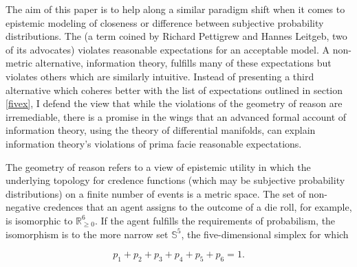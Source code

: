 \documentclass[11pt]{article}
\begin{document}
The aim of this paper is to help along a similar paradigm shift when
it comes to epistemic modeling of closeness or difference between
subjective probability distributions. The 
(a term coined by Richard Pettigrew and Hannes Leitgeb, two of its
advocates) violates reasonable expectations for an acceptable model. A
non-metric alternative, information theory, fulfills many of these
expectations but violates others which are similarly intuitive.
Instead of presenting a third alternative which coheres better with
the list of expectations outlined in section \ref{fivex}, I defend the
view that while the violations of the geometry of reason are
irremediable, there is a promise in the wings that an advanced formal
account of information theory, using the theory of differential
manifolds, can explain information theory's violations of prima facie
reasonable expectations.

The geometry of reason refers to a view of epistemic utility in which
the underlying topology for credence functions (which may be
subjective probability distributions) on a finite number of events is
a metric space. The set of non-negative credences that an agent
assigns to the outcome of a die roll, for example, is isomorphic to
$\mathbb{R}_{\geq{}0}^{6}$. If the agent fulfills the requirements of
probabilism, the isomorphism is to the more narrow set $\mathbb{S}^5$,
the five-dimensional simplex for which

\begin{equation}
  \label{eq:simplex}
  p_{1}+p_{2}+p_{3}+p_{4}+p_{5}+p_{6}=1.
\end{equation}

\end{document}
